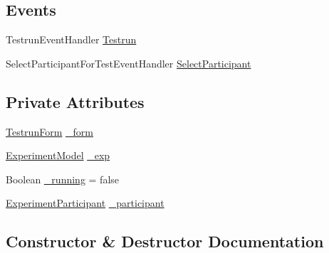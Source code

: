 \subsection*{Events}
\begin{DoxyCompactItemize}
\item 
Testrun\+Event\+Handler \hyperlink{class_web_analyzer_1_1_u_i_1_1_interaction_objects_1_1_testrun_control_aec90f2bc94369619608e0059453752d3}{Testrun}
\item 
Select\+Participant\+For\+Test\+Event\+Handler \hyperlink{class_web_analyzer_1_1_u_i_1_1_interaction_objects_1_1_testrun_control_abf256e52c1a039ca329f7c749a9087e4}{Select\+Participant}
\end{DoxyCompactItemize}
\subsection*{Private Attributes}
\begin{DoxyCompactItemize}
\item 
\hyperlink{class_web_analyzer_1_1_u_i_1_1_testrun_form}{Testrun\+Form} \hyperlink{class_web_analyzer_1_1_u_i_1_1_interaction_objects_1_1_testrun_control_add6c2a6d01609147fdd302fece571636}{\+\_\+form}
\item 
\hyperlink{class_web_analyzer_1_1_models_1_1_base_1_1_experiment_model}{Experiment\+Model} \hyperlink{class_web_analyzer_1_1_u_i_1_1_interaction_objects_1_1_testrun_control_a9c232cac904a9ae80233456406563e03}{\+\_\+exp}
\item 
Boolean \hyperlink{class_web_analyzer_1_1_u_i_1_1_interaction_objects_1_1_testrun_control_a476e0340bbef94992b2a976db6f37d25}{\+\_\+running} = false
\item 
\hyperlink{class_web_analyzer_1_1_models_1_1_base_1_1_experiment_participant}{Experiment\+Participant} \hyperlink{class_web_analyzer_1_1_u_i_1_1_interaction_objects_1_1_testrun_control_a6f2545f1b64a0d78e4584e5482dbd8b2}{\+\_\+participant}
\end{DoxyCompactItemize}


\subsection{Constructor \& Destructor Documentation}
\hypertarget{class_web_analyzer_1_1_u_i_1_1_interaction_objects_1_1_testrun_control_a4c7cc1fb505c57b84d0247abb85eb424}{}
